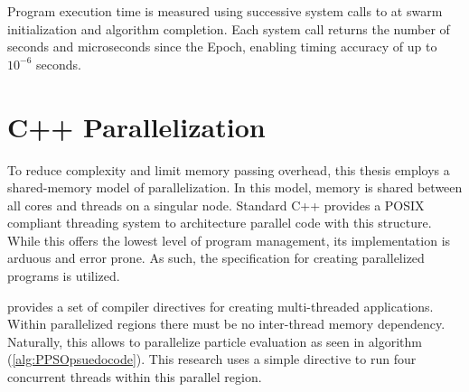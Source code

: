 \noindent Program execution time is measured using successive system calls to 
at swarm initialization and algorithm completion. Each system call returns the number of seconds
and microseconds since the Epoch, enabling timing accuracy of up to $10^{-6}$ seconds.

\section{C++ Parallelization}
\noindent To reduce complexity and limit memory passing overhead, this thesis employs a shared-memory model of 
parallelization. In this model, memory is shared between all cores and threads on a singular node.
Standard C++ provides a POSIX compliant threading system to architecture parallel code with this structure. While this offers 
the lowest level of program management, its implementation is arduous and error prone. As such, the 
specification for creating parallelized programs is utilized. \newline

\noindent {} provides a set of compiler directives for creating multi-threaded applications. Within parallelized
regions there must be no inter-thread memory dependency. Naturally, this allows  to parallelize particle
evaluation as seen in algorithm (\ref{alg:PPSOpsuedocode}). This research uses a simple    directive to
run four concurrent threads within this parallel region.
\newpage